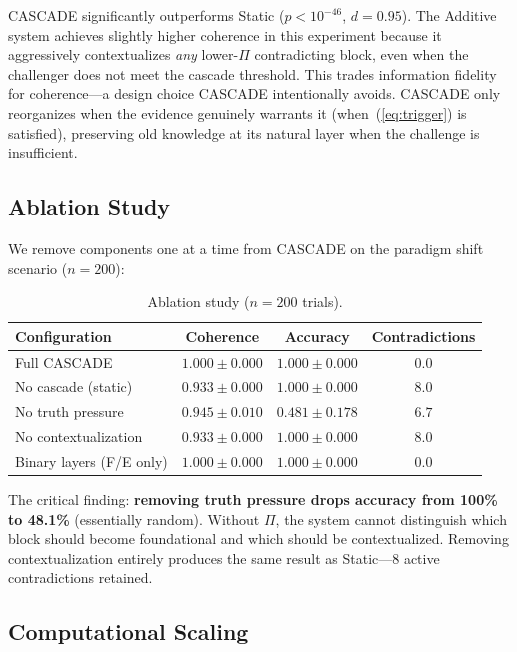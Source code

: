 \documentclass[11pt,a4paper]{article}
\theoremstyle{definition}
\newcommand{\tp}{\Pi}
\begin{document}
CASCADE significantly outperforms Static ($p < 10^{-46}$, $d = 0.95$). The Additive system achieves slightly higher coherence in this experiment because it aggressively contextualizes \emph{any} lower-$\tp$ contradicting block, even when the challenger does not meet the cascade threshold. This trades information fidelity for coherence---a design choice CASCADE intentionally avoids. CASCADE only reorganizes when the evidence genuinely warrants it (when~(\ref{eq:trigger}) is satisfied), preserving old knowledge at its natural layer when the challenge is insufficient.

\subsection{Ablation Study}\label{sec:ablation}

We remove components one at a time from CASCADE on the paradigm shift scenario ($n = 200$):

\begin{table}[H]
\centering
\caption{Ablation study ($n=200$ trials).}
\label{tab:ablation}
\begin{tabular}{@{}lccc@{}}
\toprule
\textbf{Configuration} & \textbf{Coherence} & \textbf{Accuracy} & \textbf{Contradictions} \\
\midrule
Full CASCADE & $1.000 \pm 0.000$ & $1.000 \pm 0.000$ & $0.0$ \\
No cascade (static) & $0.933 \pm 0.000$ & $1.000 \pm 0.000$ & $8.0$ \\
No truth pressure & $0.945 \pm 0.010$ & $0.481 \pm 0.178$ & $6.7$ \\
No contextualization & $0.933 \pm 0.000$ & $1.000 \pm 0.000$ & $8.0$ \\
Binary layers (F/E only) & $1.000 \pm 0.000$ & $1.000 \pm 0.000$ & $0.0$ \\
\bottomrule
\end{tabular}
\end{table}

The critical finding: \textbf{removing truth pressure drops accuracy from 100\% to 48.1\%} (essentially random). Without $\tp$, the system cannot distinguish which block should become foundational and which should be contextualized. Removing contextualization entirely produces the same result as Static---8 active contradictions retained.

\subsection{Computational Scaling}\label{sec:scaling}
\end{document}
